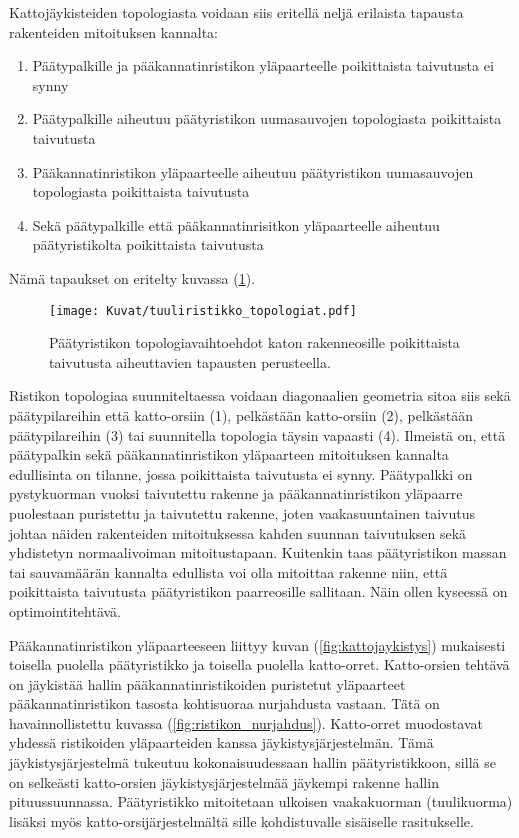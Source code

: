 \documentclass[12pt]{article}
\newenvironment{content}{\pagenumbering{arabic}}{}
\begin{document}
\begin{content}
Kattojäykisteiden topologiasta voidaan siis eritellä neljä erilaista tapausta rakenteiden mitoituksen kannalta:

\begin{enumerate}
\item Päätypalkille ja pääkannatinristikon yläpaarteelle poikittaista taivutusta ei synny
\item Päätypalkille aiheutuu päätyristikon uumasauvojen topologiasta poikittaista taivutusta
\item Pääkannatinristikon yläpaarteelle aiheutuu päätyristikon uumasauvojen topologiasta poikittaista taivutusta
\item Sekä päätypalkille että pääkannatinrisitkon yläpaarteelle aiheutuu päätyristikolta poikittaista taivutusta
\end{enumerate}

Nämä tapaukset on eritelty kuvassa (\ref{fig:tuuliristikko_topologiat}).

\begin{figure}[htb]
\texttt{[image: Kuvat/tuuliristikko\_topologiat.pdf]}
\caption{Päätyristikon topologiavaihtoehdot katon rakenneosille poikittaista taivutusta aiheuttavien tapausten perusteella.}
\label{fig:tuuliristikko_topologiat}
\end{figure}

Ristikon topologiaa suunniteltaessa voidaan diagonaalien geometria sitoa siis sekä päätypilareihin että katto-orsiin (1), pelkästään katto-orsiin (2), pelkästään päätypilareihin (3) tai suunnitella topologia täysin vapaasti (4). Ilmeistä on, että päätypalkin sekä pääkannatinristikon yläpaarteen mitoituksen kannalta edullisinta on tilanne, jossa poikittaista taivutusta ei synny. Päätypalkki on pystykuorman vuoksi taivutettu rakenne ja pääkannatinristikon yläpaarre puolestaan puristettu ja taivutettu rakenne, joten vaakasuuntainen taivutus johtaa näiden rakenteiden mitoituksessa kahden suunnan taivutuksen sekä yhdistetyn normaalivoiman mitoitustapaan. Kuitenkin taas päätyristikon massan tai sauvamäärän kannalta edullista voi olla mitoittaa rakenne niin, että poikittaista taivutusta päätyristikon paarreosille sallitaan. Näin ollen kyseessä on optimointitehtävä. 

Pääkannatinristikon yläpaarteeseen liittyy kuvan (\ref{fig:kattojaykistys}) mukaisesti toisella puolella päätyristikko ja toisella puolella katto-orret. Katto-orsien tehtävä on jäykistää hallin pääkannatinristikoiden puristetut yläpaarteet pääkannatinristikon tasosta kohtisuoraa nurjahdusta vastaan. Tätä on havainnollistettu kuvassa (\ref{fig:ristikon_nurjahdus}). Katto-orret muodostavat yhdessä ristikoiden yläpaarteiden kanssa jäykistysjärjestelmän. Tämä jäykistysjärjestelmä tukeutuu kokonaisuudessaan hallin päätyristikkoon, sillä se on selkeästi katto-orsien jäykistysjärjestelmää jäykempi rakenne hallin pituussuunnassa. Päätyristikko mitoitetaan ulkoisen vaakakuorman (tuulikuorma) lisäksi myös katto-orsijärjestelmältä sille kohdistuvalle sisäiselle rasitukselle.  \parencite{try_kaitila}  



\end{content}
\end{document}
